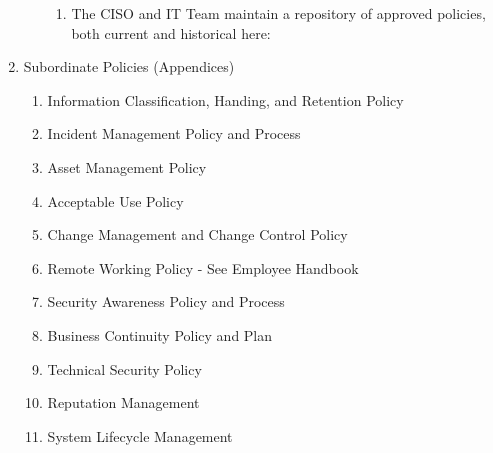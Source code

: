\documentclass[../main.tex]{subfiles}
\begin{document}
\begin{enumerate}
\begin{enumerate}
\begin{enumerate}
    \item The CISO and IT Team maintain a repository of approved policies, both current and historical here: \DocumentationandPolicies
  \end{enumerate}
  \end{enumerate}
  \item Subordinate Policies (Appendices)
  \begin{enumerate}
    \item Information Classification, Handing, and Retention Policy
    \item Incident Management Policy and Process
    \item Asset Management Policy
    \item Acceptable Use Policy
    \item Change Management and Change Control Policy
    \item Remote Working Policy - See Employee Handbook
    \item Security Awareness Policy and Process
    \item Business Continuity Policy and Plan
    \item Technical Security Policy
    \item Reputation Management
    \item System Lifecycle Management
  \end{enumerate}
\end{enumerate}
\end{document}
